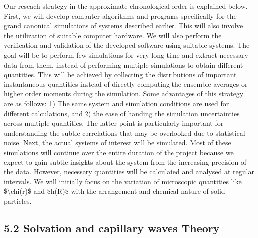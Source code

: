 \par Our reseach strategy in the approximate chronological order is explained below. First, we will develop computer algorithms and programs specifically for the grand canonical simulations of systems described earlier. This will also involve the utilization of suitable computer hardware. We will also perform the verification and validation of the developed software using suitable systems. The goal will be to perform few simulations for very long time and extract necessary data from them, instead of performing multiple simulations to obtain different quantities. This will be achieved by collecting the distributions of important instantaneous quantities instead of directly computing the ensemble averages or higher order moments during the simulation. Some advantages of this strategy are as follows: 1) The same system and simulation conditions are used for different calculations, and 2) the ease of handing the simulation uncertainties across multiple quantities. The latter point is particularly important for understanding the subtle correlations that may be overlooked due to statistical noise. Next, the actual systems of interest will be simulated. Most of these simulations will continue over the entire duration of the project because we expect to gain subtle insights about the system from the increasing precision of the data. However, necessary quantities will be calculated and analysed at regular intervals. We will initially focus on the variation of microscopic quantities like \$\textbackslash chi(r)\$ and \$h(R)\$ with the arrangement and chemical nature of solid particles.\subsection{5.2 Solvation and capillary waves Theory}

